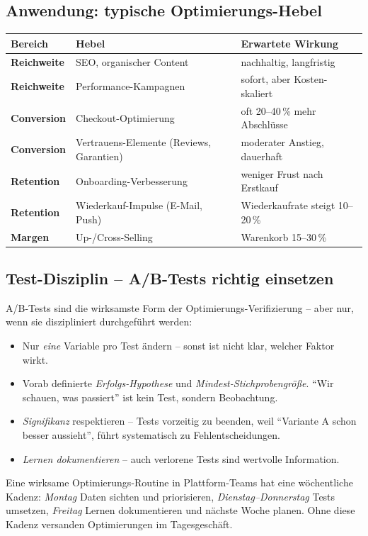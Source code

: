 \documentclass[11pt,a4paper,oneside]{article}
\begin{document}
\subsection{Anwendung: typische Optimierungs-Hebel}

\begin{tabularx}{\linewidth}{@{}>{\bfseries}lX X@{}}
\toprule
Bereich & Hebel & Erwartete Wirkung \\
\midrule
Reichweite & SEO, organischer Content & nachhaltig, langfristig \\
Reichweite & Performance-Kampagnen & sofort, aber Kosten-skaliert \\
Conversion & Checkout-Optimierung & oft 20--40\,\% mehr Abschlüsse \\
Conversion & Vertrauens-Elemente (Reviews, Garantien) & moderater Anstieg, dauerhaft \\
Retention & Onboarding-Verbesserung & weniger Frust nach Erstkauf \\
Retention & Wiederkauf-Impulse (E-Mail, Push) & Wiederkaufrate steigt 10--20\,\% \\
Margen & Up-/Cross-Selling & Warenkorb \textuparrow{} 15--30\,\% \\
\bottomrule
\end{tabularx}

\subsection{Test-Disziplin -- A/B-Tests richtig einsetzen}

A/B-Tests sind die wirksamste Form der Optimierungs-Verifizierung -- aber nur, wenn sie diszipliniert durchgeführt werden:

\begin{itemize}
  \item Nur \emph{eine} Variable pro Test ändern -- sonst ist nicht klar, welcher Faktor wirkt.
  \item Vorab definierte \emph{Erfolgs-Hypothese} und \emph{Mindest-Stichproben­größe}. ``Wir schauen, was passiert'' ist kein Test, sondern Beobachtung.
  \item \emph{Signifikanz} respektieren -- Tests vorzeitig zu beenden, weil ``Variante A schon besser aussieht'', führt systematisch zu Fehlentscheidungen.
  \item \emph{Lernen dokumentieren} -- auch verlorene Tests sind wertvolle Information.
\end{itemize}

\begin{merkbox}
Eine wirksame Optimierungs-Routine in Plattform-Teams hat eine wöchentliche Kadenz: \emph{Montag} Daten sichten und priorisieren, \emph{Dienstag--Donnerstag} Tests umsetzen, \emph{Freitag} Lernen dokumentieren und nächste Woche planen. Ohne diese Kadenz versanden Optimierungen im Tagesgeschäft.
\end{merkbox}
\end{document}
